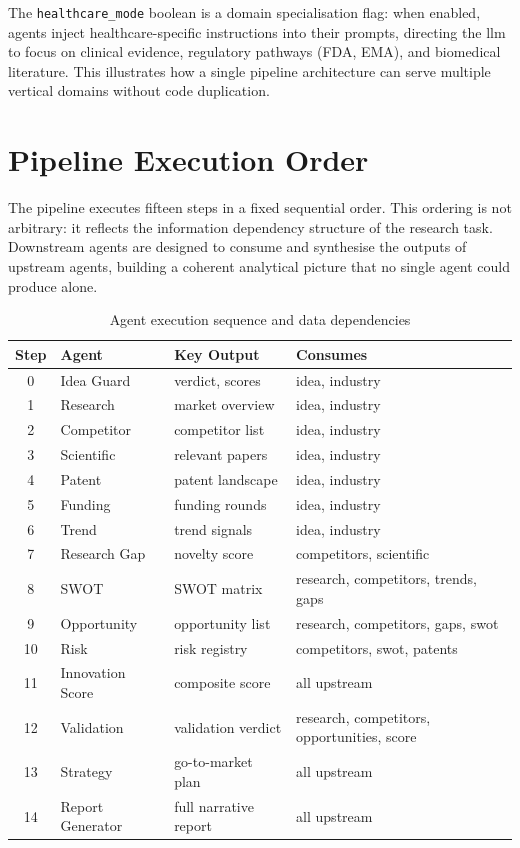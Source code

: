 \documentclass[12pt,a4paper,oneside]{book}
\begin{document}
The \texttt{healthcare\_mode} boolean is a domain specialisation flag: when enabled, agents inject healthcare-specific instructions into their prompts, directing the \gls{llm} to focus on clinical evidence, regulatory pathways (FDA, EMA), and biomedical literature. This illustrates how a single pipeline architecture can serve multiple vertical domains without code duplication.

\section{Pipeline Execution Order}

The pipeline executes fifteen steps in a fixed sequential order. This ordering is not arbitrary: it reflects the information dependency structure of the research task. Downstream agents are designed to consume and synthesise the outputs of upstream agents, building a coherent analytical picture that no single agent could produce alone.

\begin{table}[H]
\centering
\caption{Agent execution sequence and data dependencies}
\label{tab:agent_sequence}
\begin{tabularx}{\textwidth}{cllX}
\toprule
\textbf{Step} & \textbf{Agent} & \textbf{Key Output} & \textbf{Consumes} \\
\midrule
0  & Idea Guard        & verdict, scores      & idea, industry \\
1  & Research          & market overview      & idea, industry \\
2  & Competitor        & competitor list      & idea, industry \\
3  & Scientific        & relevant papers      & idea, industry \\
4  & Patent            & patent landscape     & idea, industry \\
5  & Funding           & funding rounds       & idea, industry \\
6  & Trend             & trend signals        & idea, industry \\
7  & Research Gap      & novelty score        & competitors, scientific \\
8  & SWOT              & SWOT matrix          & research, competitors, trends, gaps \\
9  & Opportunity       & opportunity list     & research, competitors, gaps, swot \\
10 & Risk              & risk registry        & competitors, swot, patents \\
11 & Innovation Score  & composite score      & all upstream \\
12 & Validation        & validation verdict   & research, competitors, opportunities, score \\
13 & Strategy          & go-to-market plan    & all upstream \\
14 & Report Generator  & full narrative report & all upstream \\
\bottomrule
\end{tabularx}
\end{table}
\end{document}
